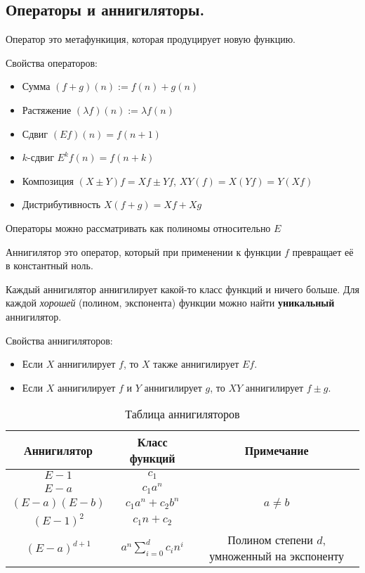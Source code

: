 \subsection{%
  Операторы и аннигиляторы.%
}

\begin{definition}
  Оператор это метафункиция, которая продуцирует новую функцию.
\end{definition}

Свойства операторов:

\begin{itemize}
  \item Сумма \((f + g)(n) := f(n) + g(n)\)
  \item Растяжение \((\lambda f)(n) := \lambda f(n)\)
  \item Сдвиг \((E f)(n) = f(n + 1)\)
  \item \(k\)-сдвиг \(E^{k} f(n) = f(n + k)\)
  \item Композиция \((X \pm Y)f = Xf \pm Yf\), \(XY(f) = X(Yf) = Y(Xf)\)
  \item Дистрибутивность \(X(f + g) = Xf + Xg\)
\end{itemize}

Операторы можно рассматривать как полиномы относительно \(E\)

\begin{definition}
  Аннигилятор это оператор, который при применении к функции \(f\) превращает её
  в константный ноль.
\end{definition}

Каждый аннигилятор аннигилирует какой-то класс функций и ничего больше. Для
каждой \textit{хорошей} (полином, экспонента) функции можно найти
\textbf{уникальный} аннигилятор.

Свойства аннигиляторов:
\begin{itemize}
  \item Если \(X\) аннигилирует \(f\), то \(X\) также аннигилирует \(Ef\).
  \item Если \(X\) аннигилирует \(f\) и \(Y\) аннигилирует \(g\), то \(XY\)
  аннигилирует \(f \pm g\).
\end{itemize}

\begin{table}[H]
  \centering

  \renewcommand{\arraystretch}{1.5}
  \begin{tabular}{c|c|c}
    Аннигилятор & Класс функций & Примечание \\
    \hline
    \(E - 1\) & \(c_{1}\) & \\
    \(E - a\) & \(c_{1} a^{n}\) & \\
    \((E - a)(E - b)\) & \(c_{1} a^{n} + c_{2} b^{n}\) & \(a \neq b\) \\
    \((E - 1)^2\) & \(c_{1} n + c_{2}\) & \\
    \((E - a)^{d + 1}\) & \(a^{n} \sum_{i = 0}^{d} c_{i} n^{i}\) &
      Полином степени \(d\), умноженный на экспоненту
  \end{tabular}\caption*{Таблица аннигиляторов}
\end{table}

